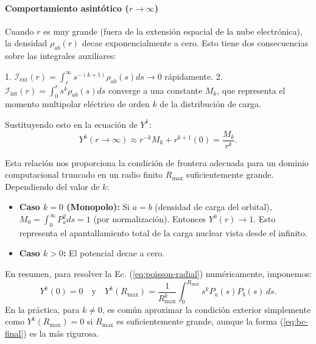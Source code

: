 \documentclass[12pt, a4paper, oneside, spanish]{book}
\begin{document}
\paragraph{Comportamiento asintótico ($r \to \infty$)}

Cuando $r$ es muy grande (fuera de la extensión espacial de la nube electrónica), la densidad $\rho_{ab}(r)$ decae exponencialmente a cero. Esto tiene dos consecuencias sobre las integrales auxiliares:

1.  $\mathcal{I}_{\text{ext}}(r) = \int_r^\infty s^{-(k+1)}\rho_{ab}(s) ds \to 0$ rápidamente.
2.  $\mathcal{I}_{\text{int}}(r) = \int_0^r s^k \rho_{ab}(s) ds$ converge a una constante $M_k$, que representa el momento multipolar eléctrico de orden $k$ de la distribución de carga.

Sustituyendo esto en la ecuación de $Y^k$:
\begin{equation}
    Y^k(r \to \infty) \approx r^{-k} M_k + r^{k+1} (0) = \frac{M_k}{r^k}.
\end{equation}

Esta relación nos proporciona la condición de frontera adecuada para un dominio computacional truncado en un radio finito $R_{\text{max}}$ suficientemente grande. Dependiendo del valor de $k$:

\begin{itemize}
    \item \textbf{Caso $k=0$ (Monopolo):} Si $a=b$ (densidad de carga del orbital), $M_0 = \int_0^\infty P_a^2 ds = 1$ (por normalización). Entonces $Y^0(r) \to 1$. Esto representa el apantallamiento total de la carga nuclear vista desde el infinito.
    \item \textbf{Caso $k > 0$:} El potencial decae a cero.
\end{itemize}

En resumen, para resolver la Ec. (\cref{eq:poisson-radial}) numéricamente, imponemos:
\begin{equation}
\label{eq:bc-final}
    Y^k(0) = 0 \quad \text{y} \quad Y^k(R_{\text{max}}) = \frac{1}{R_{\text{max}}^k} \int_0^{R_{\text{max}}} s^k P_a(s) P_b(s) \, ds.
\end{equation}
En la práctica, para $k \neq 0$, es común aproximar la condición exterior simplemente como $Y^k(R_{\text{max}}) = 0$ si $R_{\text{max}}$ es suficientemente grande, aunque la forma (\cref{eq:bc-final}) es la más rigurosa.
\end{document}
